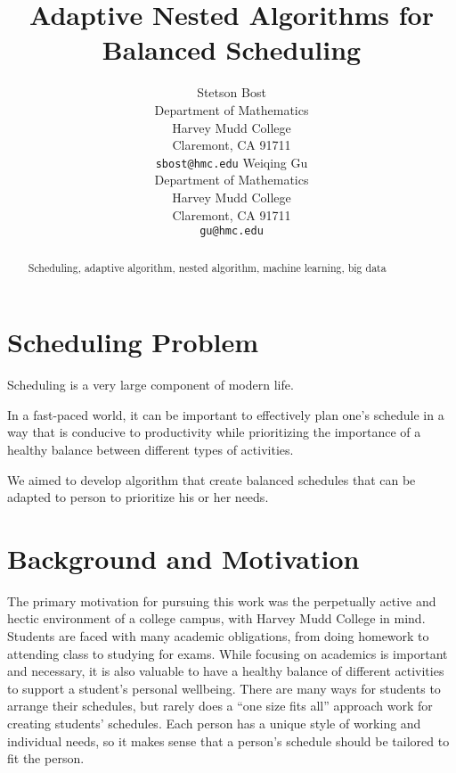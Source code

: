 \documentclass{article}
\title{Adaptive Nested Algorithms for Balanced Scheduling}
\author{
	Stetson Bost\\
	Department of Mathematics\\
	Harvey Mudd College\\
	Claremont, CA 91711 \\
	\texttt{sbost@hmc.edu}
  \And
	Weiqing Gu\\
	Department of Mathematics\\
	Harvey Mudd College\\
	Claremont, CA 91711 \\
	\texttt{gu@hmc.edu}\\
}
\newcommand{\todo}[1]{}
\begin{document}

\maketitle

\begin{abstract}
Scheduling, adaptive algorithm, nested algorithm, machine learning, big data
\end{abstract}

\section{Scheduling Problem}
	Scheduling is a very large component of modern life.
	\todo{``Find details about scheduling, wellness, (work-life) balance, etc.'' + Citations}
	In a fast-paced world, it can be important to effectively plan one's schedule in a way that is conducive to productivity while prioritizing the importance of a healthy balance between different types of activities. 
	\todo{mention need and widespread use of scheduling/applications for calenders}

	We aimed to develop algorithm that create balanced schedules that can be adapted to person to prioritize his or her needs.


\section{Background and Motivation}

	The primary motivation for pursuing this work was the perpetually active and hectic environment of a college campus, with Harvey Mudd College in mind.
	Students are faced with many academic obligations, from doing homework to attending class to studying for exams.
	While focusing on academics is important and necessary, it is also valuable to have a healthy balance of different activities to support a student's personal wellbeing.
	There are many ways for students to arrange their schedules, but rarely does a ``one size fits all'' approach work for creating students' schedules.
	Each person has a unique style of working and individual needs, so it makes sense that a person's schedule should be tailored to fit the person.
\end{document}
